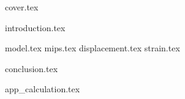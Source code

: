 \documentclass[a4paper]{report}
\begin{document}
{cover.tex}

\tableofcontents
\thispagestyle{empty}
\newpage
\setcounter{page}{1}

{introduction.tex}

{model.tex}
{mips.tex}
{displacement.tex}
{strain.tex}

{conclusion.tex}

\newpage
{}

{\renewcommand{\bibname}{References}}

\begin{appendices}

{app_calculation.tex}

\end{appendices}
\end{document}
